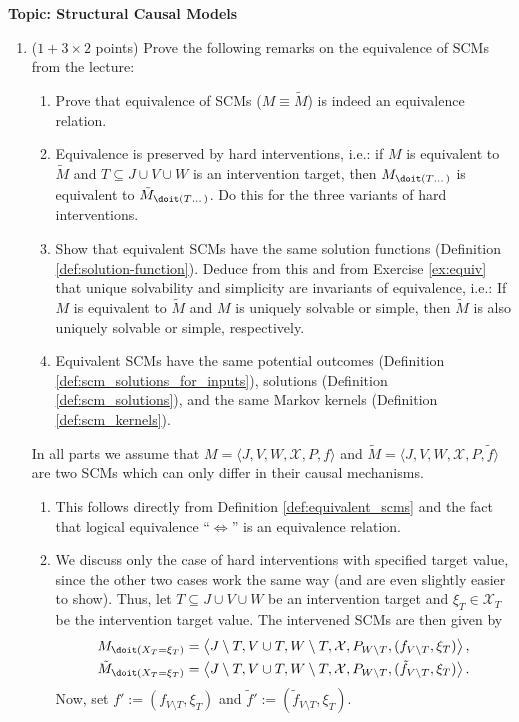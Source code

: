 
\flushleft\textbf{Topic: Structural Causal Models}

\begin{enumerate}
\item ($1 + 3\times 2$ points) Prove the following remarks on the equivalence of SCMs from the lecture:

\begin{enumerate}
  \item Prove that equivalence of SCMs ($M \equiv \tilde{M}$) is indeed an equivalence relation.  
  \item \label{ex:equiv} Equivalence is preserved by hard interventions, i.e.: if $M$ is equivalent to $\tilde{M}$ and $T \subseteq J \cup V \cup W$ is an intervention target, then $M_{\doit(T\dots)}$ is equivalent to $\tilde{M}_{\doit(T\dots)}$. Do this for the three variants of hard interventions.  
  \item Show that equivalent SCMs have the same solution functions (Definition \ref*{def:solution-function}). Deduce from this and from Exercise \ref{ex:equiv} that unique solvability and simplicity are invariants of equivalence, i.e.: If $M$ is equivalent to $\tilde{M}$ and $M$ is uniquely solvable or simple, then $\tilde{M}$ is also uniquely solvable or simple, respectively. 
  \item Equivalent SCMs have the same potential outcomes (Definition \ref*{def:scm_solutions_for_inputs}), solutions (Definition \ref*{def:scm_solutions}), and the same Markov kernels (Definition \ref*{def:scm_kernels}). 
\end{enumerate}


\begin{gradedsolution}
In all parts we assume that $M = \langle J, V, W, \mathcal{X}, P, f \rangle$ and $\tilde{M} = \langle J, V, W, \mathcal{X}, P, \tilde{f} \rangle$ are two SCMs which can only differ in their causal mechanisms.
\begin{enumerate}
	\item This follows directly from Definition \ref*{def:equivalent_scms} and the fact that logical equivalence ``$\Longleftrightarrow$'' is an equivalence relation. 
	\item We discuss only the case of hard interventions with specified target value, since the other two cases work the same way (and are even slightly easier to show).
	Thus, let $T \subseteq J \cup V \cup W$ be an intervention target and $\xi_{T} \in \mathcal{X}_T$ be the intervention target value. 
	The intervened SCMs are then given by 
	\begin{align*}
		M_{\doit(X_T = \xi_T)} = \left\langle J \setminus T, V \cup T, W \setminus T, \mathcal{X}, P_{W \setminus T}, (f_{V \setminus T}, \xi_T) \right\rangle, \\
		\tilde{M}_{\doit(X_T = \xi_T)} = \left\langle J \setminus T, V \cup T, W \setminus T, \mathcal{X}, P_{W \setminus T}, (\tilde{f}_{V \setminus T}, \xi_T) \right\rangle.
	\end{align*}
	Now, set $f' := (f_{V \setminus T}, \xi_T)$ and $\tilde{f}' := (\tilde{f}_{V \setminus T}, \xi_T)$. 


\end{enumerate}
\end{gradedsolution}
\end{enumerate}
